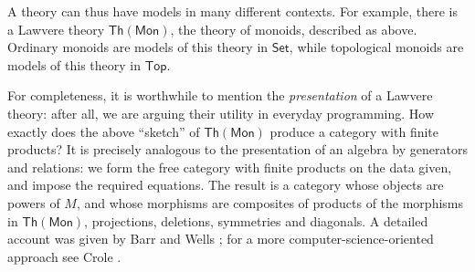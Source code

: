 \documentclass{amsart}
\theoremstyle{definition}
\newcommand{\Th}{\mathsf{Th}}
\newcommand{\Set}{\mathsf{Set}}
\newcommand{\Top}{\mathsf{Top}}
\newcommand{\Mon}{\mathsf{Mon}}
\newcommand{\T}{\mathsf{T}}
\begin{document}
A theory can thus have models in many different contexts.   For example, there is a Lawvere theory $\Th(\Mon)$, the theory of monoids, described as above.  Ordinary monoids are models of this theory in $\Set$, while topological monoids are models of this theory in $\Top$.

For completeness, it is worthwhile to mention the \textit{presentation} of a Lawvere theory: after all, we are arguing their utility in everyday programming.  How exactly does the above ``sketch'' of $\Th(\Mon)$ produce a category with finite products?  It is precisely analogous to the presentation of an algebra by generators and relations: we form the free category with finite products on the data given, and impose the required equations. The result is a category whose objects are powers of $M$, and whose morphisms are composites of products of the morphisms in $\Th(\Mon)$, projections, deletions, symmetries and diagonals.  A detailed account was given by Barr and Wells \cite[Chap.\ 4]{barrwells}; for a more computer-science-oriented approach see Crole \cite[Chap.\ 3]{crole}.

\iffalse
\begin{center}
	\begin{minipage}{.2 \textwidth}
		\begin{prooftree}
			\Axiom$a \; ,\; b \fCenter \; :\T$
			\UnaryInf$a\times b \fCenter \; : \T$
		\end{prooftree}
	\end{minipage} \qquad
	\begin{minipage}{.2 \textwidth}
		\begin{prooftree}
			\Axiom$f \; :a\to b\; \fCenter ,\; g\; :c\to d$
			\UnaryInf$f\times g \; : \; a\;\times\fCenter \;b \; \to c\times d$
		\end{prooftree}
	\end{minipage} \qquad \qquad
	\begin{minipage}{.2 \textwidth}
		\begin{prooftree}
			\Axiom$h: d\to a\; ,\; \fCenter k:e\to b$
			\doubleLine
			\UnaryInf$\big\langle h,k \big\rangle :\; e \fCenter\;\to a\times b$
		\end{prooftree}
	\end{minipage}
\end{center}
\begin{center}
\begin{minipage}{.2 \textwidth}
	\begin{prooftree}
		\Axiom$a\times b \; \fCenter : \T$
		\UnaryInf$\pi_1 : a\times b\to a \; \fCenter \; ,\; \pi_2 : a\times b\to b$
	\end{prooftree}
\end{minipage} \qquad \qquad \qquad
\begin{minipage}{.2 \textwidth}
	\begin{prooftree}
		\Axiom$\big\langle h,k \big\rangle :\; e\; \fCenter\to a\times b$
		\UnaryInf$\pi_1 \big\langle h,k \big\rangle \equiv h \; \fCenter ,\; \pi_2 \big\langle h,k \big\rangle \equiv k$
	\end{prooftree}
\end{minipage}
\end{center}
\fi
\end{document}
